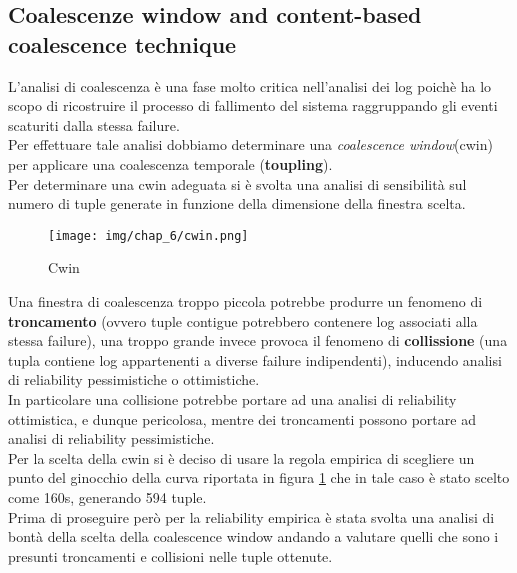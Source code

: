 \subsection{Coalescenze window and content-based coalescence technique}
L'analisi di coalescenza è una fase molto critica nell'analisi dei log poichè ha lo scopo di ricostruire il processo di fallimento del sistema raggruppando gli eventi scaturiti dalla stessa failure.\\
Per effettuare tale analisi dobbiamo determinare una \textit{coalescence window}(cwin) per applicare una coalescenza temporale (\textbf{toupling}).\\
Per determinare una cwin adeguata si è svolta una analisi di sensibilità sul numero di tuple generate in funzione della dimensione della finestra scelta.
 \begin{figure}[H]
    \centering
    \texttt{[image: img/chap\_6/cwin.png]}
    \caption{Cwin}
    \label{fig:cwindow}
\end{figure}
\noindent
Una finestra di coalescenza troppo piccola potrebbe produrre un fenomeno di \textbf{troncamento} (ovvero tuple contigue potrebbero contenere log associati alla stessa failure), una troppo grande invece provoca il fenomeno di \textbf{collissione} (una tupla contiene log appartenenti a diverse failure indipendenti), inducendo analisi di reliability pessimistiche o ottimistiche.\\
In particolare una collisione potrebbe portare ad una analisi di reliability ottimistica, e dunque pericolosa, mentre dei troncamenti possono portare ad analisi di reliability pessimistiche.\\
Per la scelta della cwin si è deciso di usare la regola empirica di scegliere un punto del ginocchio della curva riportata in figura \ref{fig:cwindow} che in tale caso è stato scelto come 160s, generando 594 tuple.\\
Prima di proseguire però per la reliability empirica è stata svolta una analisi di bontà della scelta della coalescence window andando a valutare quelli che sono i presunti troncamenti e collisioni nelle tuple ottenute.\\

